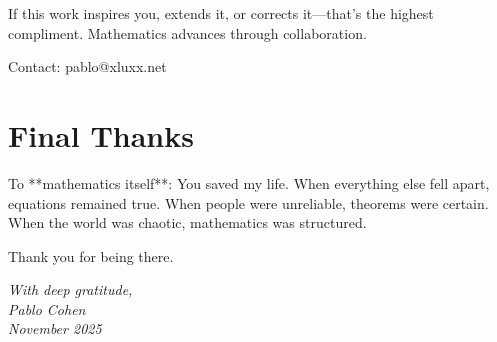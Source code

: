 If this work inspires you, extends it, or corrects it—that's the highest compliment. Mathematics advances through collaboration.

Contact: pablo@xluxx.net

\section*{Final Thanks}

To **mathematics itself**: You saved my life. When everything else fell apart, equations remained true. When people were unreliable, theorems were certain. When the world was chaotic, mathematics was structured.

Thank you for being there.

\vspace{1cm}

\begin{flushright}
\textit{With deep gratitude,}\\
\textit{Pablo Cohen}\\
\textit{November 2025}
\end{flushright}
